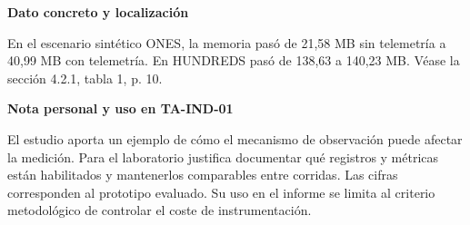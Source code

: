 \documentclass[11pt,a4paper]{article}
\newcommand{\fichabloque}[1]{\par\medskip\textbf{#1}\par\nobreak}
\begin{document}
\fichabloque{Dato concreto y localización}
En el escenario sintético ONES, la memoria pasó de 21,58 MB sin telemetría a 40,99 MB con telemetría. En HUNDREDS pasó de 138,63 a 140,23 MB. Véase la sección 4.2.1, tabla 1, p. 10.

\fichabloque{Nota personal y uso en TA-IND-01}
El estudio aporta un ejemplo de cómo el mecanismo de observación puede afectar la medición. Para el laboratorio justifica documentar qué registros y métricas están habilitados y mantenerlos comparables entre corridas. Las cifras corresponden al prototipo evaluado. Su uso en el informe se limita al criterio metodológico de controlar el coste de instrumentación.
\end{document}
